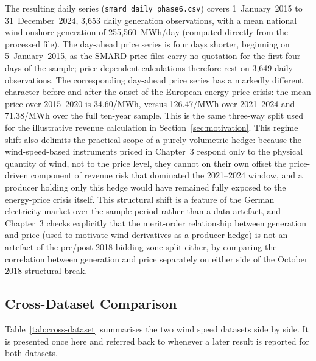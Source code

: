 \documentclass[11pt, a4paper, twoside]{article}
\begin{document}
The resulting daily series (\texttt{smard\_daily\_phase6.csv}) covers 1~January~2015 to 31~December~2024, 3{,}653 daily generation observations, with a mean national wind onshore generation of 255{,}560~MWh/day (computed directly from the processed file). The day-ahead price series is four days shorter, beginning on 5~January~2015, as the SMARD price files carry no quotation for the first four days of the sample; price-dependent calculations therefore rest on 3{,}649 daily observations. The corresponding day-ahead price series has a markedly different character before and after the onset of the European energy-price crisis: the mean price over 2015--2020 is \texteuro{}34.60/MWh, versus \texteuro{}126.47/MWh over 2021--2024 and \texteuro{}71.38/MWh over the full ten-year sample. This is the same three-way split used for the illustrative revenue calculation in Section~\ref{sec:motivation}. This regime shift also delimits the practical scope of a purely volumetric hedge: because the wind-speed-based instruments priced in Chapter~3 respond only to the physical quantity of wind, not to the price level, they cannot on their own offset the price-driven component of revenue risk that dominated the 2021--2024 window, and a producer holding only this hedge would have remained fully exposed to the energy-price crisis itself. This structural shift is a feature of the German electricity market over the sample period rather than a data artefact, and Chapter~3 checks explicitly that the merit-order relationship between generation and price (used to motivate wind derivatives as a producer hedge) is not an artefact of the pre/post-2018 bidding-zone split either, by comparing the correlation between generation and price separately on either side of the October 2018 structural break.

\subsection{Cross-Dataset Comparison}
\label{sec:data-comparison}

Table~\ref{tab:cross-dataset} summarises the two wind speed datasets side by side. It is presented once here and referred back to whenever a later result is reported for both datasets.
\end{document}
